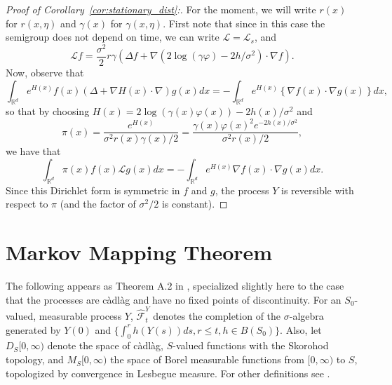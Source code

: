 \documentclass[EJP]{ejpecp} %
\renewcommand{\hat}{\widehat}
\newcommand{\IR}{\mathbb R}
\newcommand{\grad}{\nabla}
\newcommand{\Lgen}{\mathcal{L}}    %
\newcommand{\citet}[1]{\cite{#1}}
\begin{document}
\begin{proof}[Proof of Corollary~\ref{cor:stationary_dist}:]
For the moment, we will write $r(x)$ for $r(x,\eta)$
and $\gamma(x)$ for $\gamma(x,\eta)$.
First note that
since in this case the semigroup does not depend on time, 
we can write $\Lgen = \Lgen_s$, and
$$
    \Lgen f = \frac{\sigma^2}{2} r \gamma \left(
        \Delta f
        + \grad ( 2 \log(\gamma \varphi) - 2h/\sigma^2 ) \cdot \grad f
    \right) .
$$
Now, observe that
$$
    \int_{\IR^d} e^{H(x)} f(x) (\Delta + \grad H(x) \cdot \grad) g(x) dx
    =
    - \int_{\IR^d} e^{H(x)} \left\{
        \grad f(x) \cdot \grad g(x)
    \right\} dx ,
$$
so that by choosing $H(x) = 2 \log(\gamma(x) \varphi(x)) - 2h(x)/\sigma^2$
and
$$ \pi(x)
    = \frac{e^{H(x)} }{\sigma^2 r(x) \gamma(x)/2}
    = \frac{\gamma(x) \varphi(x)^2 e^{-2h(x)/\sigma^2}}{\sigma^2 r(x)/2} ,
$$
we have that
$$
    \int_{\IR^d} \pi(x) f(x) \Lgen g(x) dx
    =
    - \int_{\IR^d} e^{H(x)} \grad f(x) \cdot \grad g(x) dx .
$$
Since this Dirichlet form is symmetric in $f$ and $g$,
the process $Y$ is reversible with respect to $\pi$
(and the factor of $\sigma^2/2$ is constant).
\end{proof}

\newpage
\appendix

\section{Markov Mapping Theorem}
\label{apx:mmt}

The following appears as Theorem A.2 in \citet{etheridge/kurtz:2019},
specialized slightly here to the case that the processes 
are c\`adl\`ag and have no fixed points of discontinuity.
For an $S_0$-valued, measurable process $Y$, $\hat{\mathcal{F}}^Y_t$
denotes the completion of the $\sigma$-algebra generated by
$Y(0)$ and $\{\int_0^r h(Y(s)) ds, r \le t, h \in B(S_0)\}$.
Also, let $D_S[0,\infty)$ denote the space of c\`adl\`ag, $S$-valued functions
with the Skorohod topology, and $M_S[0,\infty)$ the space of Borel measurable functions
from $[0,\infty)$ to $S$,
topologized by convergence in Lesbegue measure.
For other definitions see \citet{etheridge/kurtz:2019}.
\end{document}
